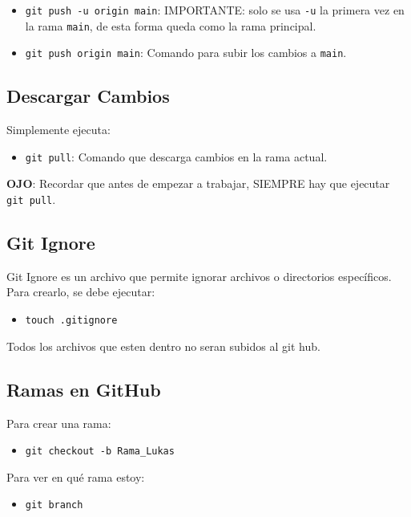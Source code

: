\documentclass{article} %
\begin{document}
\begin{itemize}
    \item \texttt{git push -u origin main}: IMPORTANTE: solo se usa \texttt{-u} la primera vez en la rama \texttt{main}, de esta forma queda como la rama principal.
    \item \texttt{git push origin main}: Comando para subir los cambios a \texttt{main}.
\end{itemize}

\subsection{Descargar Cambios}

Simplemente ejecuta:

\begin{itemize}
    \item \texttt{git pull}: Comando que descarga cambios en la rama actual.
\end{itemize}

\textbf{OJO}: Recordar que antes de empezar a trabajar, SIEMPRE hay que ejecutar \texttt{git pull}.

\subsection{Git Ignore}

Git Ignore es un archivo que permite ignorar archivos o directorios específicos. Para crearlo, se debe ejecutar:

\begin{itemize}
    \item \texttt{touch .gitignore}
\end{itemize}

Todos los archivos que esten dentro no seran subidos al git hub.

\subsection{Ramas en GitHub}

Para crear una rama:

\begin{itemize}
    \item \texttt{git checkout -b Rama\_Lukas}
\end{itemize}

Para ver en qué rama estoy:

\begin{itemize}
    \item \texttt{git branch}
\end{itemize}
\end{document}
